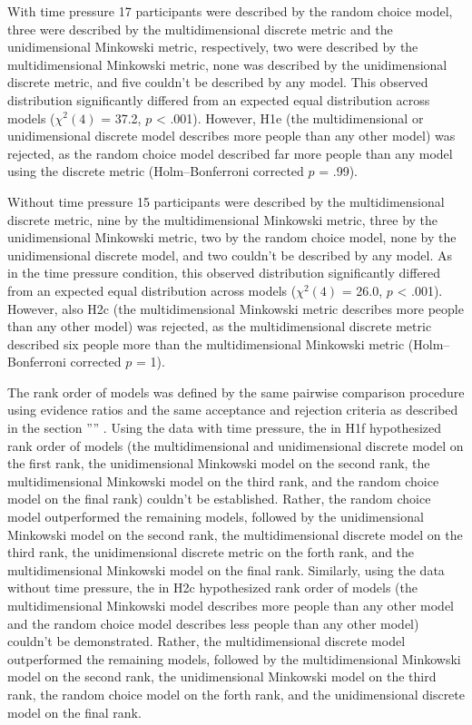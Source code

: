 \documentclass[a4paper,man,natbib]{apa6}
\begin{document}
With time pressure 17 participants were described by the random choice model, three were described by the multidimensional discrete metric and the unidimensional Minkowski metric, respectively, two were described by the multidimensional Minkowski metric, none was described by the unidimensional discrete metric, and five couldn't be described by any model. This observed distribution significantly differed from an expected equal distribution across models ($\chi^{2}(4)$ = 37.2, $p$ < .001). However, H1e (the multidimensional or unidimensional discrete model describes more people than any other model) was rejected, as the random choice model described far more people than any model using the discrete metric (Holm--Bonferroni corrected $p$ = .99). 

Without time pressure 15 participants were described by the multidimensional discrete metric, nine by the multidimensional Minkowski metric, three by the unidimensional Minkowski metric, two by the random choice model, none by the unidimensional discrete model, and two couldn't be described by any model. As in the time pressure condition, this observed distribution significantly differed from an expected equal distribution across models ($\chi^{2}(4)$ = 26.0, $p$ < .001). However, also H2c (the multidimensional Minkowski metric describes more people than any other model) was rejected, as the multidimensional discrete metric described six people more than the multidimensional Minkowski metric (Holm--Bonferroni corrected $p$ = 1).

The rank order of models was defined by the same pairwise comparison procedure using evidence ratios and the same acceptance and rejection criteria as described in the section '''' \citep[see also][p. 194]{wagenmakers2004aic}. Using the data with time pressure, the in H1f hypothesized rank order of models (the multidimensional and unidimensional discrete model on the first rank, the unidimensional Minkowski model on the second rank, the multidimensional Minkowski model on the third rank, and the random choice model on the final rank) couldn't be established. Rather, the random choice model outperformed the remaining models, followed by the unidimensional Minkowski model on the second rank, the multidimensional discrete model on the third rank, the unidimensional discrete metric on the forth rank, and the multidimensional Minkowski model on the final rank. Similarly, using the data without time pressure, the in H2c hypothesized rank order of models (the multidimensional Minkowski model describes more people than any other model and the random choice model describes less people than any other model) couldn't be demonstrated. Rather, the multidimensional discrete model outperformed the remaining models, followed by the multidimensional Minkowski model on the second rank, the unidimensional Minkowski model on the third rank, the random choice model on the forth rank, and the unidimensional discrete model on the final rank. 
\end{document}
